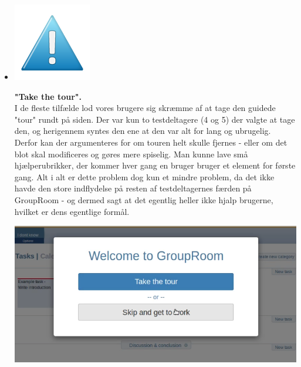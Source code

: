 \documentclass[12pt]{article}
\begin{document}
\begin{itemize}
\newpage
   \item[]       \begin{minipage}{0.07\linewidth}
  \includegraphics[scale=0.3]{Billeder/mindre}
          \end{minipage} 
          \textbf{"Take the tour".} \\
          I de fleste tilfælde lod vores brugere sig skræmme af at tage den guidede "tour" rundt på siden. Der var kun to testdeltagere (4 og 5) der valgte at tage den, og herigennem syntes den ene at den var alt for lang og ubrugelig. Derfor kan der argumenteres for om touren helt skulle fjernes - eller om det blot skal modificeres og gøres mere spiselig. Man kunne lave små hjælperubrikker, der kommer hver gang en bruger bruger et element for første gang. Alt i alt er dette problem dog kun et mindre problem, da det ikke havde den store indflydelse på resten af testdeltagernes færden på GroupRoom - og dermed sagt at det egentlig heller ikke hjalp brugerne, hvilket er dens egentlige formål.
  
    \begin{center}\includegraphics[scale=0.4]{Billeder/Take-A-Tour}\end{center}
  

\end{itemize}
\end{document}
